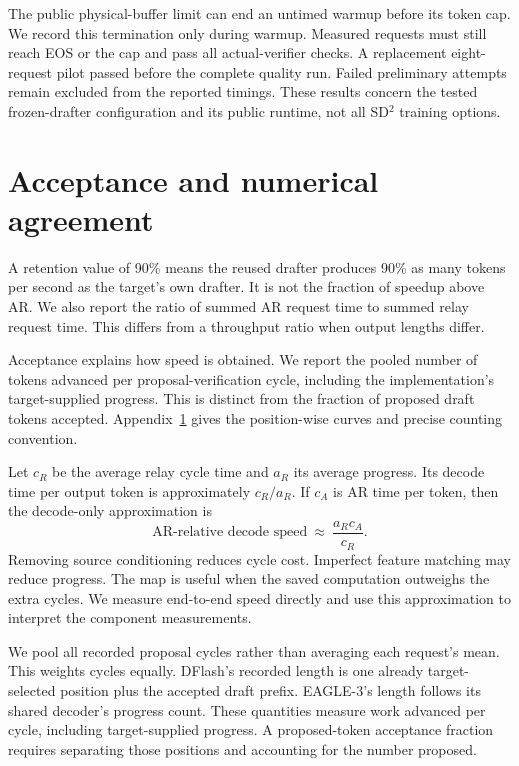 \documentclass{article}
\begin{document}
The public physical-buffer limit can end an untimed warmup before its
token cap. We record this termination only during warmup. Measured
requests must still reach EOS or the cap and pass all actual-verifier
checks. A replacement eight-request pilot passed before the complete
quality run. Failed preliminary attempts remain excluded from the
reported timings. These results concern the tested frozen-drafter
configuration and its public runtime, not all SD$^2$ training options.

\section{Acceptance and numerical agreement}
\label{app:acceptance}

A retention value of 90\% means the reused drafter produces 90\% as many
tokens per second as the target's own drafter. It is not the fraction of
speedup above AR. We also report the ratio of summed AR request time to
summed relay request time. This differs from a throughput ratio when
output lengths differ.

Acceptance explains how speed is obtained. We report the pooled number
of tokens advanced per proposal-verification cycle, including the
implementation's target-supplied progress. This is distinct from the
fraction of proposed draft tokens accepted. Appendix~\ref{app:acceptance}
gives the position-wise curves and precise counting convention.

Let $c_R$ be the average relay cycle time and $a_R$ its average progress.
Its decode time per output token is approximately $c_R/a_R$.
If $c_A$ is AR time per token, then the decode-only approximation is
\begin{equation}
\text{AR-relative decode speed}\ \approx\ \frac{a_R c_A}{c_R}.
\label{eq:cycle}
\end{equation}
Removing source conditioning reduces cycle cost. Imperfect feature
matching may reduce progress. The map is useful when the saved computation
outweighs the extra cycles. We measure end-to-end speed directly and use
this approximation to interpret the component measurements.

We pool all recorded proposal cycles rather than averaging each request's
mean. This weights cycles equally. DFlash's recorded length is one
already target-selected position plus the accepted draft prefix.
EAGLE-3's length follows its shared decoder's progress count. These
quantities measure work advanced per cycle, including target-supplied
progress. A proposed-token acceptance fraction requires separating those
positions and accounting for the number proposed.
\end{document}
